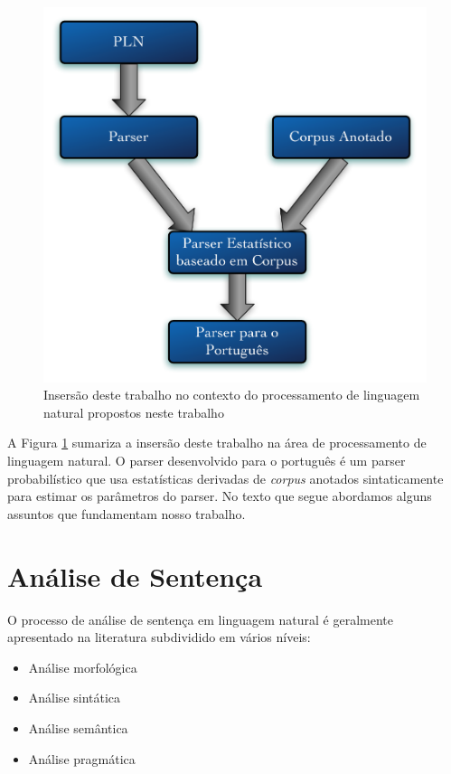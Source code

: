 \begin{figure}
	\begin{center}
		\includegraphics[scale=0.5]{fases.pdf}
		\caption{\label{fases} Insersão deste trabalho no contexto do processamento de linguagem natural propostos neste trabalho}		
	\end{center}
\end{figure}

A Figura \ref{fases} sumariza a insersão deste trabalho na área de processamento de linguagem natural. O parser desenvolvido para o português é um parser probabilístico que usa estatísticas derivadas de \emph{corpus} anotados sintaticamente para estimar os parâmetros do parser. No texto que segue abordamos alguns assuntos que fundamentam nosso trabalho.

\section{Análise de Sentença} %
\label{sec:analise_da_sentenca}

O processo de análise de sentença em linguagem natural é geralmente apresentado na literatura subdividido em vários níveis:

\begin{itemize}
	\item Análise morfológica
	\item Análise sintática
	\item Análise semântica
	\item Análise pragmática
\end{itemize}

